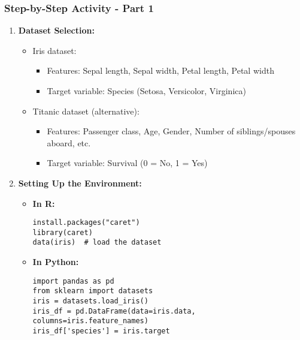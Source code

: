 \documentclass[aspectratio=169]{beamer}
\begin{document}
\begin{frame}[fragile]
    \frametitle{Step-by-Step Activity - Part 1}
    \begin{enumerate}
        \item \textbf{Dataset Selection:}
        \begin{itemize}
            \item Iris dataset: 
            \begin{itemize}
                \item Features: Sepal length, Sepal width, Petal length, Petal width
                \item Target variable: Species (Setosa, Versicolor, Virginica)
            \end{itemize}
            \item Titanic dataset (alternative):
            \begin{itemize}
                \item Features: Passenger class, Age, Gender, Number of siblings/spouses aboard, etc.
                \item Target variable: Survival (0 = No, 1 = Yes)
            \end{itemize}
        \end{itemize}

        \item \textbf{Setting Up the Environment:}
        \begin{itemize}
            \item \textbf{In R:}
            \begin{lstlisting}
install.packages("caret")
library(caret)
data(iris)  # load the dataset
            \end{lstlisting}
            \item \textbf{In Python:}
            \begin{lstlisting}
import pandas as pd
from sklearn import datasets
iris = datasets.load_iris()
iris_df = pd.DataFrame(data=iris.data, columns=iris.feature_names)
iris_df['species'] = iris.target
            \end{lstlisting}
        \end{itemize}
    \end{enumerate}
\end{frame}
\end{document}
